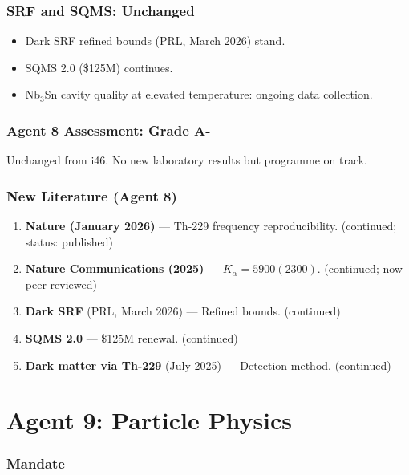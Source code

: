 \documentclass[11pt,a4paper]{article}
\begin{document}
\section{SRF and SQMS: Unchanged}

\begin{itemize}
\item Dark SRF refined bounds (PRL, March 2026) stand.
\item SQMS 2.0 (\$125M) continues.
\item Nb$_3$Sn cavity quality at elevated temperature: ongoing data collection.
\end{itemize}

\section{Agent 8 Assessment: Grade A-}

Unchanged from i46. No new laboratory results but programme on track.

\section{New Literature (Agent 8)}

\begin{enumerate}
\item \textbf{Nature (January 2026)} --- Th-229 frequency reproducibility. (continued; status: published)
\item \textbf{Nature Communications (2025)} --- $K_\alpha = 5900(2300)$. (continued; now peer-reviewed)
\item \textbf{Dark SRF} (PRL, March 2026) --- Refined bounds. (continued)
\item \textbf{SQMS 2.0} --- \$125M renewal. (continued)
\item \textbf{Dark matter via Th-229} (July 2025) --- Detection method. (continued)
\end{enumerate}


\part{Agent 9: Particle Physics}
\label{part:agent9}

\section{Mandate}
\end{document}
